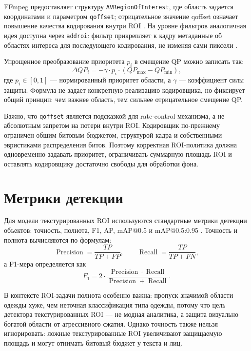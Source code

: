 \documentclass[12pt,a4paper,oneside,openany]{report}
\begin{document}
FFmpeg предоставляет структуру \texttt{AVRegionOfInterest}, где область задается координатами и
параметром \texttt{qoffset}; отрицательное значение qoffset означает повышение качества
кодирования внутри ROI \cite{ffmpeg_roi}. На уровне фильтров аналогичная идея доступна через
\texttt{addroi}: фильтр прикрепляет к кадру метаданные об областях интереса для последующего
кодирования, не изменяя сами пиксели \cite{ffmpeg_addroi}.

Упрощенное преобразование приоритета $p_i$ в смещение QP можно записать так:
\begin{equation}
  \Delta QP_i = -\gamma \cdot p_i \cdot (QP_{\max} - QP_{\min}),
  \label{eq:qoffset}
\end{equation}
где $p_i \in [0,1]$ --- нормированный приоритет области, а $\gamma$ --- коэффициент силы защиты.
Формула не задает конкретную реализацию кодировщика, но фиксирует общий принцип: чем важнее
область, тем сильнее отрицательное смещение QP.

Важно, что \texttt{qoffset} является подсказкой для rate-control механизма, а не абсолютным
запретом на потери внутри ROI. Кодировщик по-прежнему ограничен общим битовым бюджетом,
структурой кадра и собственными эвристиками распределения битов. Поэтому корректная ROI-политика
должна одновременно задавать приоритет, ограничивать суммарную площадь ROI и оставлять
кодировщику достаточно свободы для обработки фона.


\section{Метрики детекции}

Для модели текстурированных ROI используются стандартные метрики детекции объектов: точность,
полнота, F1, AP, mAP@0.5 и mAP@0.5:0.95 \cite{ultra_metrics}. Точность и полнота вычисляются по
формулам:
\begin{equation}
  \operatorname{Precision} =\frac{TP}{TP+FP},\qquad\operatorname{Recall} =\frac{TP}{TP+FN},
  \label{eq:precision_recall}
\end{equation}
а F1-мера определяется как
\begin{equation}
  F_1 =2
  \cdot\frac{\operatorname{Precision}\cdot\operatorname{Recall}}{\operatorname{Precision}+\operatorname{Recall}}.
  \label{eq:f1}
\end{equation}

В контексте ROI-задачи полнота особенно важна: пропуск значимой области одежды хуже, чем
неточная классификация типа одежды, потому что цель детектора текстурированных ROI --- не модная
аналитика, а защита визуально богатой области от агрессивного сжатия. Однако точность также
нельзя игнорировать: ложные текстурированные ROI увеличивают защищаемую площадь и могут отнимать
битовый бюджет у текста и лиц.
\end{document}
